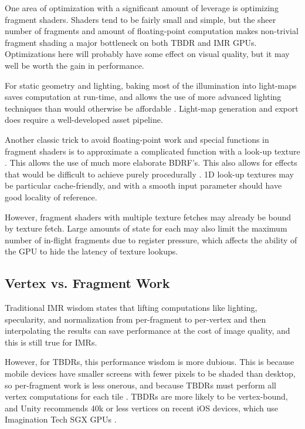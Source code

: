 One area of optimization with a significant amount of leverage is optimizing
fragment shaders.  Shaders tend to be fairly small and simple, but the sheer
number of fragments and amount of floating-point computation makes non-trivial
fragment shading a major bottleneck on both TBDR and IMR GPUs.  Optimizations
here will probably have some effect on visual quality, but it may well be worth
the gain in performance.

For static geometry and lighting, baking most of the illumination into
light-maps saves computation at run-time, and allows the use of more advanced
lighting techniques than would otherwise be affordable \cite{Miller99}
\cite{Unity11}.  Light-map generation and export does require a well-developed
asset pipeline.

Another classic trick to avoid floating-point work and special functions in
fragment shaders is to approximate a complicated function with a look-up
texture \cite{Pranckevicius11b}.  This allows the use of much more elaborate
BDRF's.  This also allows for effects that would be difficult to achieve purely
procedurally \cite{Mitchell07}.  1D look-up textures may be particular
cache-friendly, and with a smooth input parameter should have good locality of
reference.  

However, fragment shaders with multiple texture fetches may already be bound by
texture fetch.  Large amounts of state for each may also limit the maximum
number of in-flight fragments due to register pressure, which affects the
ability of the GPU to hide the latency of texture lookups.

\subsection{Vertex vs. Fragment Work}
\label{Jon-McCaffrey-Vertex-vs-Fragment-Work}

Traditional IMR wisdom states that lifting computations like lighting,
specularity, and normalization from per-fragment to per-vertex and then
interpolating the results can save performance at the cost of image quality,
and this is still true for IMRs.

However, for TBDRs, this performance wisdom is more dubious.  This is because
mobile devices have smaller screens with fewer pixels to be shaded than
desktop, so per-fragment work is less onerous, and because TBDRs must perform
all vertex computations for each tile \cite{Apple11}.  TBDRs are more likely to
be vertex-bound, and Unity recommends 40k or less vertices on recent iOS
devices, which use Imagination Tech SGX GPUs \cite{Unity11}.

